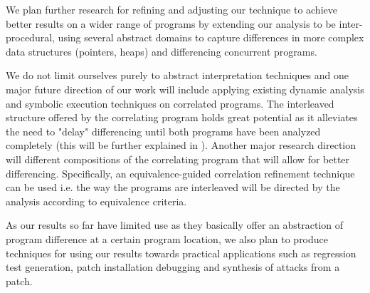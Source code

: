 We plan further research for refining and adjusting our technique to achieve better results on a wider range of programs by extending our analysis to be inter-procedural, using several abstract domains to capture differences in more complex data structures (pointers, heaps) and differencing concurrent programs.

We do not limit ourselves purely to abstract interpretation techniques and one major future direction of our work will include applying existing dynamic analysis and symbolic execution techniques on correlated programs. The interleaved structure offered by the correlating program holds great potential as it alleviates the need to "delay" differencing until both programs have been analyzed completely (this will be further explained in ). Another major research direction will different compositions of the correlating program that will allow for better differencing. Specifically, an equivalence-guided correlation refinement technique can be used i.e. the way the programs are interleaved will be directed by the analysis according to equivalence criteria.

As our results so far have limited use as they basically offer an abstraction of program difference at a certain program location, we also plan to produce techniques for using our results towards practical applications such as regression test generation, patch installation debugging and synthesis of attacks from a patch.

